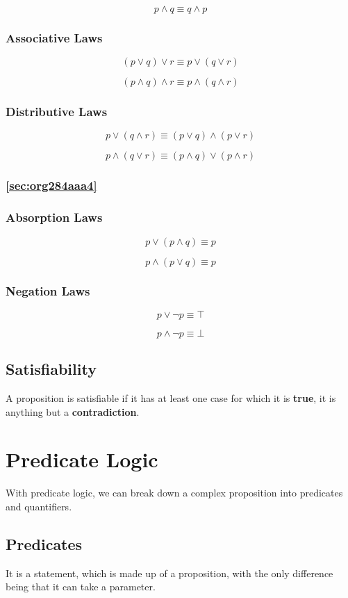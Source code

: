 \documentclass[11pt]{article}
\begin{document}
\[
p \land q \equiv q \land p
\]
\subsubsection{Associative Laws}
\label{sec:org76a20db}
\[
(p \lor q) \lor r \equiv p \lor (q \lor r)
\]

\[
(p \land q) \land r \equiv p \land (q \land r)
\]
\subsubsection{Distributive Laws}
\label{sec:org3890aab}
\[
p \lor (q \land r) \equiv (p \lor q) \land (p \lor r)
\]

\[
p \land (q \lor r) \equiv (p \land q) \lor (p \land r)
\]
\subsubsection{\ref{sec:org284aaa4}}
\label{sec:org074dc9c}
\subsubsection{Absorption Laws}
\label{sec:org75aad49}
\[
p \lor (p \land q) \equiv p
\]

\[
p \land (p \lor q) \equiv p
\]
\subsubsection{Negation Laws}
\label{sec:org184d6cc}
\[
p \lor \neg p \equiv \top
\]

\[
p \land \neg p \equiv \bot
\]
\subsection{Satisfiability}
\label{sec:orgb17327a}
A proposition is satisfiable if it has at least one case for which it is \textbf{true}, it is anything but a \textbf{contradiction}.
\section{Predicate Logic}
\label{sec:org06f3678}
With predicate logic, we can break down a complex proposition into predicates and quantifiers.

\subsection{Predicates}
\label{sec:org2f0c7bc}
It is a statement, which is made up of a proposition, with the only difference being that it can take a parameter.
\end{document}
